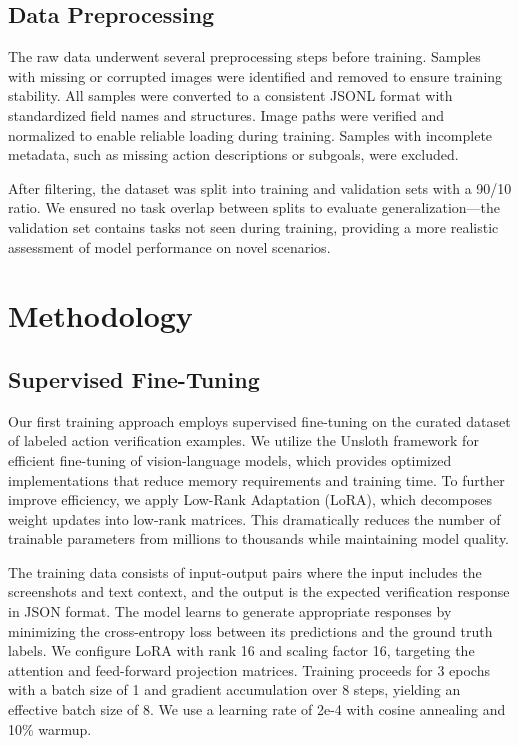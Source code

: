 \documentclass[11pt,a4paper]{article}
\begin{document}
\subsection{Data Preprocessing}

The raw data underwent several preprocessing steps before training. Samples with missing or corrupted images were identified and removed to ensure training stability. All samples were converted to a consistent JSONL format with standardized field names and structures. Image paths were verified and normalized to enable reliable loading during training. Samples with incomplete metadata, such as missing action descriptions or subgoals, were excluded.

After filtering, the dataset was split into training and validation sets with a 90/10 ratio. We ensured no task overlap between splits to evaluate generalization---the validation set contains tasks not seen during training, providing a more realistic assessment of model performance on novel scenarios.


\section{Methodology}

\subsection{Supervised Fine-Tuning}

Our first training approach employs supervised fine-tuning on the curated dataset of labeled action verification examples. We utilize the Unsloth framework for efficient fine-tuning of vision-language models, which provides optimized implementations that reduce memory requirements and training time. To further improve efficiency, we apply Low-Rank Adaptation (LoRA), which decomposes weight updates into low-rank matrices. This dramatically reduces the number of trainable parameters from millions to thousands while maintaining model quality.

The training data consists of input-output pairs where the input includes the screenshots and text context, and the output is the expected verification response in JSON format. The model learns to generate appropriate responses by minimizing the cross-entropy loss between its predictions and the ground truth labels. We configure LoRA with rank 16 and scaling factor 16, targeting the attention and feed-forward projection matrices. Training proceeds for 3 epochs with a batch size of 1 and gradient accumulation over 8 steps, yielding an effective batch size of 8. We use a learning rate of 2e-4 with cosine annealing and 10\% warmup.
\end{document}
